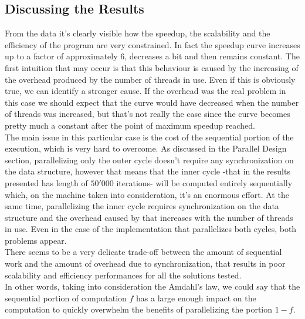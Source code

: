 \documentclass[12pt, letterpaper]{article}  %
\begin{document}
\subsection{Discussing the Results}
From the data it's clearly visible how the speedup, the scalability and the efficiency of the program are very constrained. In fact the speedup curve increases up to a factor of approximately $6$, decreases a bit and then remains constant. The first intuition that may occur is that this behaviour is caused by the increasing of the overhead produced by the number of threads in use. Even if this is obviously true, we can identify a stronger cause. If the overhead was the real problem in this case we should expect that the curve would have decreased when the number of threads was increased, but that's not really the case since the curve becomes pretty much a constant after the point of maximum speedup reached.\\
The main issue in this particular case is the cost of the sequential portion of the execution, which is very hard to overcome. As discussed in the Parallel Design section, parallelizing only the outer cycle doesn't require any synchronization on the data structure, however that means that the inner cycle -that in the results presented has length of $50'000$ iterations- will be computed entirely sequentially which, on the machine taken into consideration, it's an enormous effort. At the same time, parallelizing the inner cycle requires synchronization on the data structure and the overhead caused by that increases with the number of threads in use. Even in the case of the implementation that parallelizes both cycles, both problems appear.\\
There seems to be a very delicate trade-off between the amount of sequential work and the amount of overhead due to synchronization, that results in poor scalability and efficiency performances for all the solutions tested.\\
In other words, taking into consideration the Amdahl's law, we could say that the sequential portion of computation $f$ has a large enough impact on the computation to quickly overwhelm the benefits of parallelizing the portion $1-f$.
\end{document}
